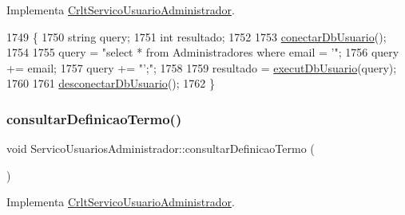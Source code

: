 Implementa \mbox{\hyperlink{class_crlt_servico_usuario_administrador_af98ebf0c1347a8df6a06e8465312ed3a}{Crlt\+Servico\+Usuario\+Administrador}}.


\begin{DoxyCode}
1749 \{
1750   \textcolor{keywordtype}{string} query;
1751   \textcolor{keywordtype}{int} resultado;
1752 
1753   \mbox{\hyperlink{comando_sql_8cpp_a4f89ddcbc4cf8f2587d89f72f8c7900d}{conectarDbUsuario}}();
1754 
1755   query = \textcolor{stringliteral}{"select * from Administradores where email = '"};
1756   query += email;
1757   query += \textcolor{stringliteral}{"';"};
1758 
1759   resultado = \mbox{\hyperlink{comando_sql_8cpp_a748197580e7f9acdbf48c78de1f7924b}{executDbUsuario}}(query);
1760 
1761   \mbox{\hyperlink{comando_sql_8cpp_a969be9911913568e30d4ae8963338bc3}{desconectarDbUsuario}}();
1762 \}
\end{DoxyCode}
\mbox{\label{class_servico_usuarios_administrador_acc178ea9b5ed289bde27ca853e874962}} 
\subsubsection{\texorpdfstring{consultar\+Definicao\+Termo()}{consultarDefinicaoTermo()}}
{\footnotesize\ttfamily void Servico\+Usuarios\+Administrador\+::consultar\+Definicao\+Termo (\begin{DoxyParamCaption}{ }\end{DoxyParamCaption})\hspace{0.3cm}{\ttfamily [virtual]}}



Implementa \mbox{\hyperlink{class_crlt_servico_usuario_administrador_a2cddc1d55c76597e69ce39dab1dc1026}{Crlt\+Servico\+Usuario\+Administrador}}.


